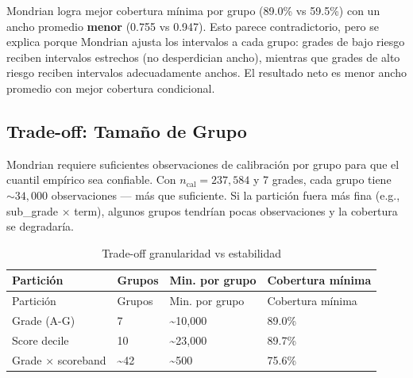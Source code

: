 \documentclass[
  spanish,
  11pt,
  letterpaper,
]{scrbook}
\theoremstyle{plain}
\theoremstyle{remark}
\begin{document}
\begin{tcolorbox}[enhanced jigsaw, arc=.35mm, bottomrule=.15mm, bottomtitle=1mm, breakable, colback=white, colbacktitle=quarto-callout-tip-color!10!white, colframe=quarto-callout-tip-color-frame, coltitle=black, left=2mm, leftrule=.75mm, opacityback=0, opacitybacktitle=0.6, rightrule=.15mm, title=\textcolor{quarto-callout-tip-color}{\faLightbulb}\hspace{0.5em}{Eficiencia vs Cobertura}, titlerule=0mm, toprule=.15mm, toptitle=1mm]

Mondrian logra mejor cobertura mínima por grupo (89.0\% vs 59.5\%) con
un ancho promedio \textbf{menor} (0.755 vs 0.947). Esto parece
contradictorio, pero se explica porque Mondrian ajusta los intervalos a
cada grupo: grades de bajo riesgo reciben intervalos estrechos (no
desperdician ancho), mientras que grades de alto riesgo reciben
intervalos adecuadamente anchos. El resultado neto es menor ancho
promedio con mejor cobertura condicional.

\end{tcolorbox}

\subsection{Trade-off: Tamaño de
Grupo}\label{trade-off-tamauxf1o-de-grupo}

Mondrian requiere suficientes observaciones de calibración por grupo
para que el cuantil empírico sea confiable. Con
\(n_\text{cal} = 237{,}584\) y 7 grades, cada grupo tiene
\(\sim 34{,}000\) observaciones --- más que suficiente. Si la partición
fuera más fina (e.g., sub\_grade × term), algunos grupos tendrían pocas
observaciones y la cobertura se degradaría.

\begin{longtable}[]{@{}llll@{}}
\caption{Trade-off granularidad vs
estabilidad}\label{tbl-partition-tradeoff}\tabularnewline
\toprule\noalign{}
Partición & Grupos & Min. por grupo & Cobertura mínima \\
\midrule\noalign{}
\endfirsthead
\toprule\noalign{}
Partición & Grupos & Min. por grupo & Cobertura mínima \\
\midrule\noalign{}
\endhead
\bottomrule\noalign{}
\endlastfoot
Grade (A-G) & 7 & \textasciitilde10,000 & 89.0\% \\
Score decile & 10 & \textasciitilde23,000 & 89.7\% \\
Grade × scoreband & \textasciitilde42 & \textasciitilde500 & 75.6\% \\
\end{longtable}
\end{document}

